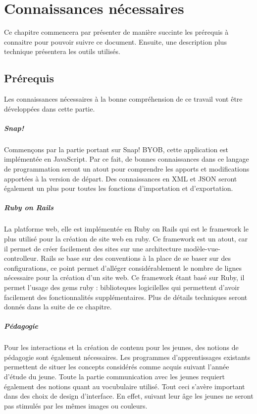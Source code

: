 \chapter{Connaissances nécessaires}
Ce chapitre commencera par présenter de manière succinte les prérequis à connaitre pour pouvoir suivre ce document. Ensuite, une description plus technique présentera les outils utilisés.

\section{Prérequis}
Les connaissances nécessaires à la bonne compréhension de ce travail vont être développées dans cette partie.

\paragraph{Snap!}
Commençons par la partie portant sur Snap! BYOB, cette application est implémentée en JavaScript. Par ce fait, de bonnes connaissances dans ce langage de programmation seront un atout pour comprendre les apports et modifications apportées à la version de départ. Des connaissances en XML et JSON seront également un plus pour toutes les fonctions d'importation et d'exportation.

\paragraph{Ruby on Rails}
La platforme web, elle est implémentée en Ruby on Rails qui est le framework le plus utilisé pour la création de site web en ruby. Ce framework est un atout, car il permet de créer facilement des sites sur une architecture modèle-vue-controlleur. Rails se base sur des conventions à la place de se baser sur des configurations, ce point permet d'alléger considérablement le nombre de lignes nécessaire pour la création d'un site web. Ce framework étant basé sur Ruby, il permet l'usage des gems ruby : biblioteques logicilelles qui permettent d'avoir facilement des fonctionnalités supplémentaires. Plus de détails techniques seront donnés dans la suite de ce chapitre.

\paragraph{Pédagogie}
Pour les interactions et la création de contenu pour les jeunes, des notions de pédagogie sont également nécessaires. Les programmes d'apprentissages existants permettent de situer les concepts considérés comme acquis suivant l'année d'étude du jeune. Toute la partie communication avec les jeunes requiert également des notions quant au vocubulaire utilisé. Tout ceci s'avère important dans des choix de design d'interface. En effet, suivant leur âge les jeunes ne seront pas stimulés par les mêmes images ou couleurs.


